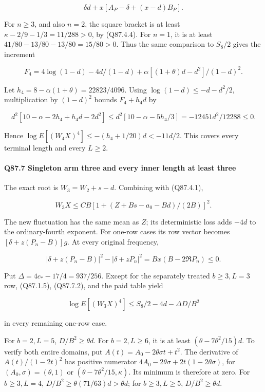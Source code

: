 \[
 \delta d+x[A_P-\delta+(x-d)B_P].
 \tag{Q87.6.2}\label{eq:Q87:6.2}
\]

For \(n\ge\allowbreak 3\), and also \(n=\allowbreak 2\), the square bracket is at least
\(\kappa-2/9-1/3=\allowbreak 11/288>\allowbreak 0\), by (Q87.4.4).
For \(n=\allowbreak 1\), it is at least
\(41/80-13/80-13/80=\allowbreak 15/80>\allowbreak 0\).
Thus the same comparison to \(S_8/2\) gives the increment

\[
 F_4=4\log(1-d)-4d/(1-d)
 +\alpha[(1+\theta)d-d^2]/(1-d)^2.
\]

Let \(h_4=\allowbreak 8-\alpha(1+\theta)=\allowbreak 22823/4096\).
Using \(\log(1-d)\le\allowbreak -d-d^2/2\), multiplication by \((1-d)^2\)
bounds \(F_4+h_4d\) by

\[
 d^2[10-\alpha-2h_4+h_4d-2d^2]
 \le d^2[10-\alpha-5h_4/3]
 =-12451d^2/12288\le0.
\]

Hence \(\log E[(W_4X)^4]\le\allowbreak -(h_4+1/20)d<\allowbreak -11d/2\).
This covers every terminal length and every \(L\ge\allowbreak 2\).

\paragraph{Q87.7 Singleton arm three and every inner length at least three}\label{part:Q87.7}

The exact root is \(W_3=\allowbreak W_2+s-d\). Combining with (Q87.4.1),

\[
 W_3X\le CB[1+(Z+Bs-a_0-Bd)/(2B)]^2.
 \tag{Q87.7.1}\label{eq:Q87:7.1}
\]

The new fluctuation has the same mean as \(Z\); its deterministic
loss adds \(-4d\) to the ordinary-fourth exponent.
For one-row cases its row vector becomes
\([\delta+z(P_n-B)]g\). At every original frequency,

\[
 |\delta+z(P_n-B)|^2-|\delta+zP_n|^2
 =Bx(B-2\Re P_n)\le0.
 \tag{Q87.7.2}\label{eq:Q87:7.2}
\]

Put \(\Delta=\allowbreak 4c_*-17/4=\allowbreak 937/256\). Except for the separately
treated \(b\ge\allowbreak 3,\allowbreak  L=\allowbreak 3\) row, (Q87.1.5), (Q87.7.2), and the paid table yield

\[
 \log E[(W_3X)^4]\le S_8/2-4d-\Delta D/B^2
 \tag{Q87.7.3}\label{eq:Q87:7.3}
\]

in every remaining one-row case.

For \(b=\allowbreak 2,\allowbreak  L=\allowbreak 5\), \(D/B^2\ge\allowbreak \theta d\). For \(b=\allowbreak 2,\allowbreak  L\ge\allowbreak 6\),
it is at least \((\theta-7\theta^2/15)d\). To verify both entire
domains, put \(A(t)=\allowbreak A_0-2\theta\sigma t+t^2\). The derivative
of \(A(t)/(1-2t)^2\) has positive numerator
\(4A_0-2\theta\sigma+2t(1-2\theta\sigma)\), for
\((A_0,\allowbreak  \sigma)=\allowbreak (\theta,\allowbreak  1)\) or
\((\theta-7\theta^2/15,\allowbreak  \kappa)\). Its minimum is therefore at zero.
For \(b\ge\allowbreak 3,\allowbreak  L=\allowbreak 4\), \(D/B^2\ge\allowbreak \theta(71/63)d>\allowbreak \theta d\);
for \(b\ge\allowbreak 3,\allowbreak  L\ge\allowbreak 5\), \(D/B^2\ge\allowbreak \theta d\).

